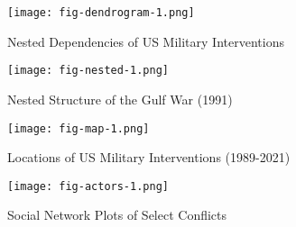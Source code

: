 \documentclass[fleqn,12pt]{article}
\begin{document}
\clearpage
{}
\newpage
\begin{figure}[h]
	\begin{center}
		\caption{Nested Dependencies of US Military Interventions}
		{\texttt{[image: fig-dendrogram-1.png]}}
		\label{fig:fig-dendrogram-1}
		\vspace{0.1 in}
	\end{center}
\end{figure}

\clearpage
{}
\newpage
\begin{figure}[h]
	\begin{center}
		\caption{Nested Structure of the Gulf War (1991)}
		{\texttt{[image: fig-nested-1.png]}}
		\label{fig:fig-nested-1}
		\vspace{0.1 in}
	\end{center}
\end{figure}

\clearpage
{}
\newpage
\begin{figure}[h]
	\begin{center}
		\caption{Locations of US Military Interventions (1989-2021)}
		{\texttt{[image: fig-map-1.png]}}
		\label{fig:fig-map-1}
		\vspace{0.1 in}
	\end{center}
\end{figure}

\clearpage
{}
\newpage
\begin{figure}[h]
	\begin{center}
		\caption{Social Network Plots of Select Conflicts}
		{\texttt{[image: fig-actors-1.png]}}
		\label{fig:fig-actors-1}
		\vspace{0.1 in}
	\end{center}
\end{figure}

\clearpage

\newpage


\end{document}
